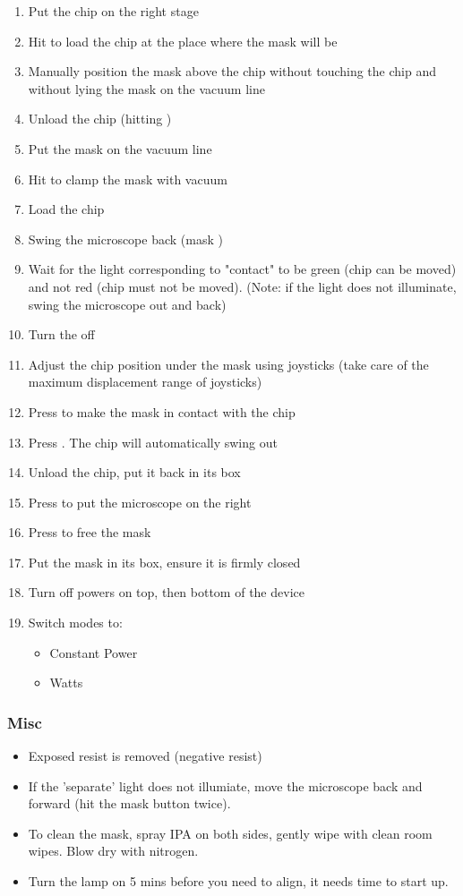 \begin{enumerate}
\item Put the chip on the right stage
\item Hit  to load the chip at the place where the mask will be
\item Manually position the mask above the chip without touching the chip and without lying the mask on the vacuum line
\item Unload the chip (hitting )
\item Put the mask on the vacuum line
\item Hit  to clamp the mask with vacuum
\item Load the chip
\item Swing the microscope back (mask )
\item Wait for the light corresponding to "contact" to be green (chip can be moved) and not red (chip must not be moved).
(Note: if the light does not illuminate, swing the microscope out and back)
\item Turn the  off
\item Adjust the chip position under the mask using joysticks (take care of the maximum displacement range of joysticks)
\item Press  to make the mask in contact with the chip
\item Press . The chip will automatically swing out
\item Unload the chip, put it back in its box
\item Press  to put the microscope on the right
\item Press  to free the mask
\item Put the mask in its box, ensure it is firmly closed
\item Turn off powers on top, then bottom of the device
\item Switch modes to:
\begin{itemize}[nolistsep, noitemsep]
\item Constant Power
\item Watts
\end{itemize}
\end{enumerate}
\newpage
\subsubsection{Misc}
\begin{itemize}
\item Exposed resist is removed (negative resist)
\item If the 'separate' light does not illumiate, move the microscope back and forward (hit the mask  button twice).
\item To clean the mask, spray IPA on both sides, gently wipe with clean room wipes. Blow dry with nitrogen.
\item Turn the lamp on 5 mins before you need to align, it needs time to start up.
\end{itemize}
\newpage



